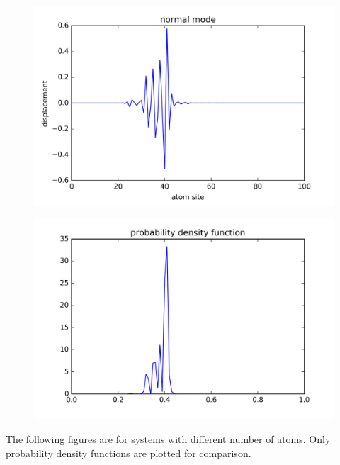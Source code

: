 \begin{figure}[!htbh]
\centering
\begin{minipage}{.45\textwidth}
  \centering
  \includegraphics[width=1.1\linewidth]{Harmonic_spring_ratio/spr_N_103sp_2p_0_576th.png}
  \label{fig:spring normal mode high frequency}
\end{minipage}\qquad
\begin{minipage}{.45\textwidth}
  \centering
  \includegraphics[width=1.1\linewidth]{Harmonic_spring_ratio/densProb_0_5N_103m_2p_76th.png}
  \label{fig:spring prob density high frequency}
\end{minipage}
\end{figure}


\newpage
The following figures are for systems with different number of atoms. Only probability density functions are plotted for comparison. 

